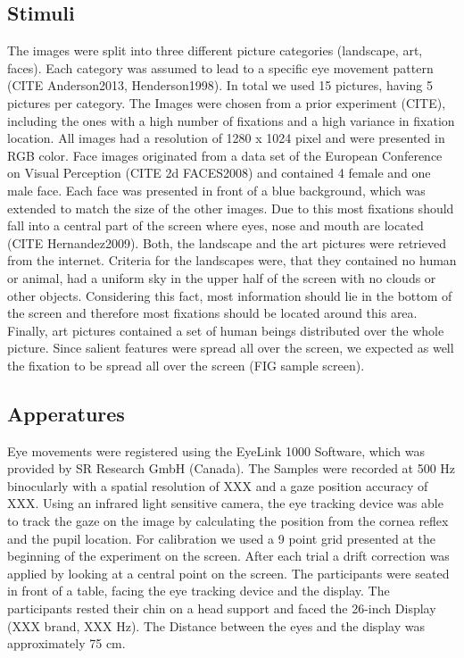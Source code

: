 \documentclass[a4paper,man,natbib,floatsintext]{apa6}
\begin{document}
\subsection{Stimuli} 
The images were split into three different picture categories (landscape, art, faces). Each category was assumed to lead to a specific eye movement pattern (CITE Anderson2013, Henderson1998). In total we used 15 pictures, having 5 pictures per category. The Images were chosen from a prior experiment (CITE), including the ones with a high number of fixations and a high variance in fixation location. All images had a resolution of 1280 x 1024 pixel and were presented in RGB color. Face images originated from a data set of the European Conference on Visual Perception (CITE 2d FACES2008) and contained 4 female and one male face. Each face was presented in front of a blue background, which was extended to match the size of the other images. Due to this most fixations should fall into a central part of the screen where eyes, nose and mouth are located (CITE Hernandez2009). Both, the landscape and the art pictures were retrieved from the internet. Criteria for the landscapes were, that they contained no human or animal, had a uniform sky in the upper half of the screen with no clouds or other objects. Considering this fact, most information should lie in the bottom of the screen and therefore most fixations should be located around this area. Finally, art pictures contained a set of human beings distributed over the whole picture. Since salient features were spread all over the screen, we expected as well the fixation to be spread all over the screen (FIG sample screen). \\

\subsection{Apperatures} 
Eye movements were registered using the EyeLink 1000 Software, which was provided by SR Research GmbH (Canada). The Samples were recorded at 500 Hz binocularly with a spatial resolution of XXX and a gaze position accuracy of XXX. Using an infrared light sensitive camera, the eye tracking device was able to track the gaze on the image by calculating the position from the cornea reflex and the pupil location. For calibration we used a 9 point grid presented at the beginning of the experiment on the screen. After each trial a drift correction was applied by looking at a central point on the screen. The participants were seated in front of a table, facing the eye tracking device and the display. The participants rested their chin on a head support and faced the 26-inch Display (XXX brand, XXX Hz). The Distance between the eyes and the display was approximately 75 cm. \\
\end{document}
